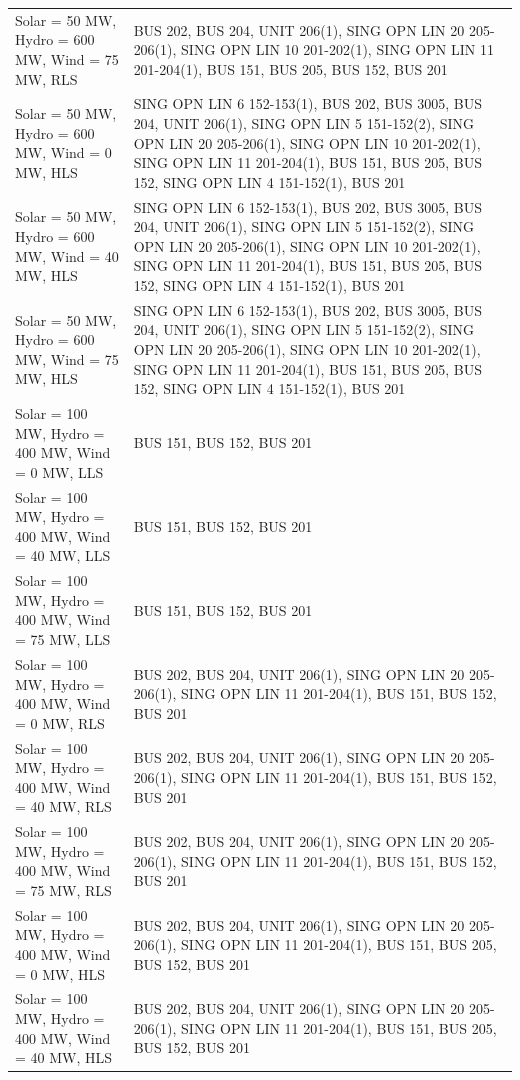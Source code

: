\documentclass[10pt]{report}
\begin{document}
\begin{table}[H]
{\begin{tabular}{lp{15cm}}
Solar = 50 MW, Hydro = 600 MW, Wind = 75 MW, RLS & BUS 202, BUS 204, UNIT 206(1), SING OPN LIN   20 205-206(1), SING OPN LIN   10 201-202(1), SING OPN LIN   11 201-204(1), BUS 151, BUS 205, BUS 152, BUS 201 \\
Solar = 50 MW, Hydro = 600 MW, Wind = 0 MW, HLS & SING OPN LIN   6 152-153(1), BUS 202, BUS 3005, BUS 204, UNIT 206(1), SING OPN LIN   5 151-152(2), SING OPN LIN   20 205-206(1), SING OPN LIN   10 201-202(1), SING OPN LIN   11 201-204(1), BUS 151, BUS 205, BUS 152, SING OPN LIN   4 151-152(1), BUS 201 \\
Solar = 50 MW, Hydro = 600 MW, Wind = 40 MW, HLS & SING OPN LIN   6 152-153(1), BUS 202, BUS 3005, BUS 204, UNIT 206(1), SING OPN LIN   5 151-152(2), SING OPN LIN   20 205-206(1), SING OPN LIN   10 201-202(1), SING OPN LIN   11 201-204(1), BUS 151, BUS 205, BUS 152, SING OPN LIN   4 151-152(1), BUS 201 \\
Solar = 50 MW, Hydro = 600 MW, Wind = 75 MW, HLS & SING OPN LIN   6 152-153(1), BUS 202, BUS 3005, BUS 204, UNIT 206(1), SING OPN LIN   5 151-152(2), SING OPN LIN   20 205-206(1), SING OPN LIN   10 201-202(1), SING OPN LIN   11 201-204(1), BUS 151, BUS 205, BUS 152, SING OPN LIN   4 151-152(1), BUS 201 \\
Solar = 100 MW, Hydro = 400 MW, Wind = 0 MW, LLS & BUS 151, BUS 152, BUS 201 \\
Solar = 100 MW, Hydro = 400 MW, Wind = 40 MW, LLS & BUS 151, BUS 152, BUS 201 \\
Solar = 100 MW, Hydro = 400 MW, Wind = 75 MW, LLS & BUS 151, BUS 152, BUS 201 \\
Solar = 100 MW, Hydro = 400 MW, Wind = 0 MW, RLS & BUS 202, BUS 204, UNIT 206(1), SING OPN LIN   20 205-206(1), SING OPN LIN   11 201-204(1), BUS 151, BUS 152, BUS 201 \\
Solar = 100 MW, Hydro = 400 MW, Wind = 40 MW, RLS & BUS 202, BUS 204, UNIT 206(1), SING OPN LIN   20 205-206(1), SING OPN LIN   11 201-204(1), BUS 151, BUS 152, BUS 201 \\
Solar = 100 MW, Hydro = 400 MW, Wind = 75 MW, RLS & BUS 202, BUS 204, UNIT 206(1), SING OPN LIN   20 205-206(1), SING OPN LIN   11 201-204(1), BUS 151, BUS 152, BUS 201 \\
Solar = 100 MW, Hydro = 400 MW, Wind = 0 MW, HLS & BUS 202, BUS 204, UNIT 206(1), SING OPN LIN   20 205-206(1), SING OPN LIN   11 201-204(1), BUS 151, BUS 205, BUS 152, BUS 201 \\
Solar = 100 MW, Hydro = 400 MW, Wind = 40 MW, HLS & BUS 202, BUS 204, UNIT 206(1), SING OPN LIN   20 205-206(1), SING OPN LIN   11 201-204(1), BUS 151, BUS 205, BUS 152, BUS 201 \\

\end{tabular}}
\end{table}
\end{document}
